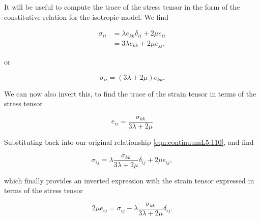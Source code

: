 It will be useful to compute the trace of the stress tensor in the form of the constitutive relation for the isotropic model.  We find

\begin{align*}
\sigma_{ii}
&= \lambda e_{kk} \delta_{ii} + 2 \mu e_{ii} \\
&= 3 \lambda e_{kk} + 2 \mu e_{jj},
\end{align*}

or

\begin{equation}\label{eqn:continuumL5:150}
\sigma_{ii} = (3 \lambda + 2 \mu) e_{kk}.
\end{equation}

We can now also invert this, to find the trace of the strain tensor in terms of the stress tensor

\begin{equation}\label{eqn:continuumL5:130}
e_{ii} = \frac{\sigma_{kk}}{3 \lambda + 2 \mu}
\end{equation}

Substituting back into our original relationship \ref{eqn:continuumL5:110}, and find

\begin{equation}\label{eqn:continuumL5:110b}
\sigma_{ij} = \lambda \frac{\sigma_{kk}}{3 \lambda + 2 \mu} \delta_{ij} + 2 \mu e_{ij},
\end{equation}

which finally provides an inverted expression with the strain tensor expressed in terms of the stress tensor

\begin{equation}\label{eqn:continuumL5:110c}
\boxed{
2 \mu e_{ij} =
\sigma_{ij} - \lambda \frac{\sigma_{kk}}{3 \lambda + 2 \mu} \delta_{ij}.
}
\end{equation}

